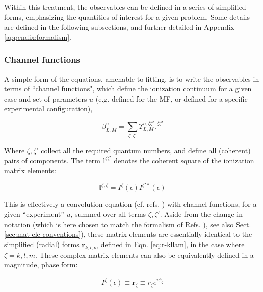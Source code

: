 \documentclass[10pt]{article}
\begin{document}
Within this treatment, the observables can be defined in a series of simplified forms, emphasizing the quantities of interest for a given problem. Some details are defined in the following subsections, and further detailed in Appendix \ref{appendix:formalism}.


\subsubsection{Channel functions\label{sec:channel-funcs}}

A simple form of the equations, amenable to fitting, is to write the observables in terms of ``channel functions", which define the ionization continuum for a given case and set of parameters $u$ (e.g. defined for the MF, or defined for a specific experimental configuration),

\begin{equation}
\beta_{L,M}^{u}=\sum_{\zeta,\zeta'}\varUpsilon_{L,M}^{u,\zeta\zeta'}\mathbb{I}^{\zeta\zeta'}\label{eqn:channel-fns}
\end{equation}


Where $\zeta,\zeta'$ collect all the required quantum numbers, and define all (coherent) pairs of components. The term $\mathbb{I}^{\zeta\zeta'}$ denotes the coherent square of the ionization matrix elements:

\begin{equation}
\mathbb{I}^{\zeta,\zeta}=I^{\zeta}(\epsilon)I^{\zeta'*}(\epsilon)
\label{eqn:I-zeta}
\end{equation}

This is effectively a convolution equation (cf. refs. \cite{Reid2000,gregory2021MolecularFramePhotoelectron}) with channel functions, for a given ``experiment'' $u$, summed over all terms $\zeta,\zeta'$. Aside from the change in notation (which is here chosen to match the formalism of Refs. \cite{Gianturco1994, Lucchese1986, Natalense1999}), see also Sect. \ref{sec:mat-ele-conventions}), these matrix elements are essentially identical to the simplified (radial) forms $\mathbf{r}_{k,l,m}$ defined in Eqn. \ref{eq:r-kllam}, in the case where $\zeta=k,l,m$. These complex matrix elements can also be equivalently defined in a magnitude, phase form:

\begin{equation}
I^{\zeta}(\epsilon)\equiv\mathbf{r}_{\zeta}\equiv r_{\zeta}e^{i\phi_{\zeta}}
\end{equation}
\end{document}
